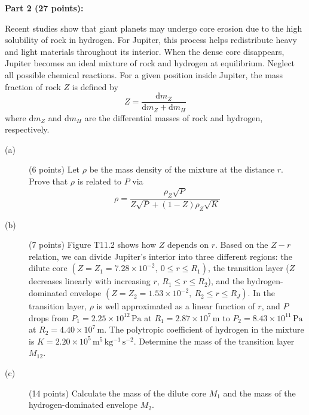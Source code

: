 \medskip\noindent\textbf{Part 2 (27 points):}

Recent studies show that giant planets may undergo core erosion due to the
high solubility of rock in hydrogen. For Jupiter, this process helps
redistribute heavy and light materials throughout its interior. When the dense
core disappears, Jupiter becomes an ideal mixture of rock and hydrogen at
equilibrium. Neglect all possible chemical reactions. For a given position
inside Jupiter, the mass fraction of rock $Z$ is defined by
\[ Z = \frac{\mathrm{d}m_Z}{\mathrm{d}m_Z + \mathrm{d}m_H} \]
where $\mathrm{d}m_Z$ and $\mathrm{d}m_H$ are the differential masses of rock
and hydrogen, respectively.

\begin{description}
\item[(a)] (6 points) Let $\rho$ be the mass density of the mixture at the
  distance $r$. Prove that $\rho$ is related to $P$ via
  \[ \rho = \frac{\rho_Z\sqrt{P}}{Z\sqrt{P} + (1 - Z)\rho_Z\sqrt{K}} \]
\item[(b)] (7 points) Figure T11.2 shows how $Z$ depends on $r$. Based on the
  $Z - r$ relation, we can divide Jupiter's interior into three different
  regions: the dilute core $(Z = Z_1 = 7.28 \times 10^{-2},\ 0 \le r \le R_1)$,
  the transition layer ($Z$ decreases linearly with increasing $r$,
  $R_1 \le r \le R_2$), and the hydrogen-dominated envelope
  $(Z = Z_2 = 1.53 \times 10^{-2},\ R_2 \le r \le R_J)$. In the transition
  layer, $\rho$ is well approximated as a linear function of $r$, and $P$
  drops from $P_1 = 2.25 \times 10^{12}\,\mathrm{Pa}$ at
  $R_1 = 2.87 \times 10^{7}\,\mathrm{m}$ to
  $P_2 = 8.43 \times 10^{11}\,\mathrm{Pa}$ at
  $R_2 = 4.40 \times 10^{7}\,\mathrm{m}$. The polytropic coefficient of
  hydrogen in the mixture is
  $K = 2.20 \times 10^{5}\,\mathrm{m^5\,kg^{-1}\,s^{-2}}$. Determine the mass
  of the transition layer $M_{12}$.


\item[(c)] (14 points) Calculate the mass of the dilute core $M_1$ and the
  mass of the hydrogen-dominated envelope $M_2$.
\end{description}

